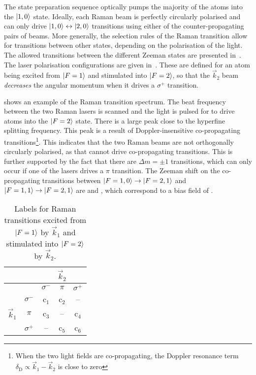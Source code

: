 The state preparation sequence optically pumps the majority of the atoms 
into the \(\ket{1,0}\) state. Ideally, each
Raman beam is perfectly circularly polarised and can only drive
\(\ket{1,0}\leftrightarrow\ket{2,0}\) transitions using either of the
counter-propagating pairs of beams. More generally, the selection
rules of the Raman transition allow for transitions between other
states, depending on the polarisation of the light. The allowed
transitions between the different Zeeman states are presented
in~. The laser polarisation
configurations are given in~. These
are defined for an atom being excited from \(\ket{F=1}\) and
stimulated into \(\ket{F=2}\), so that the \(\vec{k}_2\) beam
\textit{decreases} the angular momentum when it drives a \(\sigma^+\)
transition. 
\par\noindent
{} shows an example of the Raman
transition spectrum. The beat frequency
between the two Raman lasers is scanned and the light is pulsed for
 to drive atoms into the \(\ket{F=2}\)
state. There is a large peak close to the hyperfine splitting
frequency. This peak is a result of Doppler-insensitive co-propagating
transitions\footnote{When the two light fields are co-propagating, the
  Doppler resonance term \(\delta_\text{D} \propto \vec{k}_1 -
\vec{k}_2\) is close to zero}. This indicates that the two Raman beams
are not orthogonally circularly polarised, as that cannot drive co-propagating
transitions. This is further supported by the fact
that there are \(\Delta m = \pm 1\) transitions, which can only occur
if one of the lasers drives a \(\pi\) transition. The Zeeman shift on
the co-propagating transitions between \(\ket{F=1,0}
\rightarrow \ket{F=2,1}\) and \(\ket{F=1,1}\rightarrow \ket{F=2,1}\)
are  and , which
correspond to a bias field of .
\begin{table}
  \centering
  \begin{tabular}{ccccc}
    \toprule
    & & \multicolumn{3}{c}{\(\vec{k}_2\)} \\
     \midrule
     & & \(\sigma^-\) & \(\pi\) & \(\sigma^+\)\\
     \multirow{3}{*}{\(\vec{k}_1\)} & \(\sigma^-\) &  c\(_1\) &
     c\(_2\)&
     --  \\
     & \(\pi\) &c\(_3\) & -- & c\(_4\) \\
     & \(\sigma^+\) & --& c\(_5\)& c\(_6\)\\
    \bottomrule
  \end{tabular}
  \caption[Raman transition polarisation configurations]{Labels for Raman transitions excited
    from \(\ket{F=1}\) by \(\vec{k}_1\) and stimulated into
  \(\ket{F=2}\) by \(\vec{k}_2\).}
  \label{tab:raman_pol_config}
\end{table}
